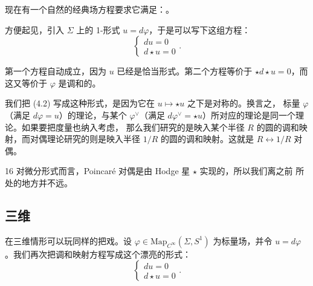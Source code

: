 现在有一个自然的经典场方程要求它满足：。

方便起见，引入 $\Sigma$ 上的 1-形式 $u=d\varphi$，于是可以写下这组方程：
\begin{equation}\tag{4.2}
\begin{cases}
du=0\\
d\star u=0
\end{cases}.
\end{equation}

第一个方程自动成立，因为 $u$ 已经是恰当形式。第二个方程等价于
$\star d\star u=0$，而这又等价于 $\varphi$ 是调和的。

我们把 (4.2) 写成这种形式，是因为它在 $u\mapsto\star u$ 之下是对称的。换言之，
标量 $\varphi$（满足 $d\varphi=u$）的理论，与某个 $\varphi^{\vee}$（满足
$d\varphi^{\vee}=\star u$）所对应的理论是同一个理论。如果要把度量也纳入考虑，
那么我们研究的是映入某个半径 $R$ 的圆的调和映射，而对偶理论研究的则是映入半径
$1/R$ 的圆的调和映射。这就是 $R\leftrightarrow 1/R$ 对偶。

\begin{srcrem}{16}
对微分形式而言，Poincaré 对偶是由 Hodge 星 $\star$ 实现的，所以我们离之前
所处的地方并不远。
\end{srcrem}


\subsection{三维}
\label{sec:4-1-2}

在三维情形可以玩同样的把戏。设 $\varphi\in \mathrm{Map}_{C^{\infty}}(\Sigma,S^{1})$
为标量场，并令 $u=d\varphi$。我们再次把调和映射方程写成这个漂亮的形式：
\begin{equation}\tag{4.3}
\begin{cases}
du=0\\
d\star u=0
\end{cases}.
\end{equation}



